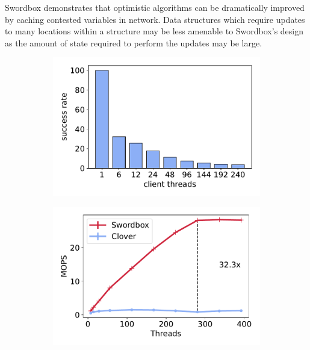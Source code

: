 Swordbox demonstrates that optimistic algorithms can be
dramatically improved by caching contested variables in
network. Data structures which require updates to many
locations within a structure may be less amenable to
Swordbox's design as the amount of state required to perform
the updates may be large.


\begin{figure}[t!]
    \begin{subfigure}{.33\textwidth}
      \centering
      \includegraphics[width=.9\linewidth]{fig/success_rate.pdf}
    \end{subfigure}%
    \begin{subfigure}{.33\textwidth}
      \centering
      \includegraphics[width=.9\linewidth]{fig/full_system_performance.pdf}
    \end{subfigure}
    \begin{subfigure}{.33\textwidth}

\end{subfigure}
\end{figure}
